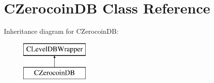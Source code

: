\hypertarget{class_c_zerocoin_d_b}{}\section{C\+Zerocoin\+DB Class Reference}
\label{class_c_zerocoin_d_b}
Inheritance diagram for C\+Zerocoin\+DB\+:\begin{figure}[H]
\begin{center}
\leavevmode
\includegraphics[height=2.000000cm]{class_c_zerocoin_d_b}
\end{center}
\end{figure}
